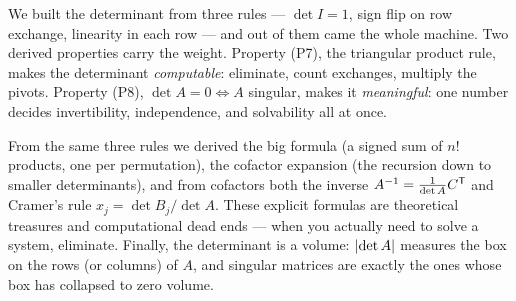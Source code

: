 We built the determinant from three rules --- $\det I=1$, sign flip on row exchange, linearity in each row --- and out of them came the whole machine. Two derived properties carry the weight. Property (P7), the triangular product rule, makes the determinant \emph{computable}: eliminate, count exchanges, multiply the pivots. Property (P8), $\det A=0\iff A$ singular, makes it \emph{meaningful}: one number decides invertibility, independence, and solvability all at once.

From the same three rules we derived the big formula (a signed sum of $n!$ products, one per permutation), the cofactor expansion (the recursion down to smaller determinants), and from cofactors both the inverse $A^{-1}=\frac{1}{\det A}C^{\mathsf T}$ and Cramer's rule $x_j=\det B_j/\det A$. These explicit formulas are theoretical treasures and computational dead ends --- when you actually need to solve a system, eliminate. Finally, the determinant is a volume: $\left|\det A\right|$ measures the box on the rows (or columns) of $A$, and singular matrices are exactly the ones whose box has collapsed to zero volume.

